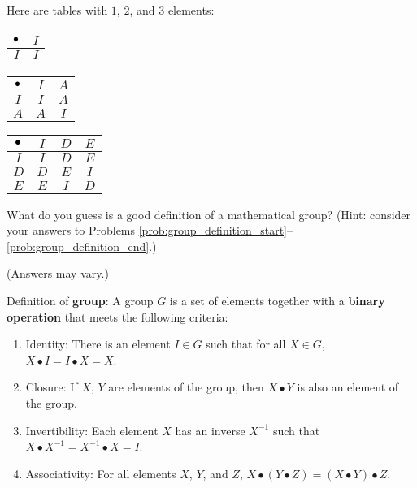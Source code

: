 \documentclass[../gatm_answers.tex]{subfiles}
\begin{document}
Here are tables with $1$, $2$, and $3$ elements:\\
\begin{center}
	\begin{minipage}{0.3\textwidth}
		\centering
		\begin{tabular}{c|c}
			\hline
			$\bullet$ & $I$ \\ \hline
			\rowcolor{light-gray}
			$I$ & $I$ \\ \hline
		\end{tabular}
	\end{minipage}
	\hfill
	\begin{minipage}{0.3\textwidth}
		\centering
		\begin{tabular}{c|cc}
			\hline
			$\bullet$ & $I$ & $A$ \\ \hline
			\rowcolor{light-gray}
			$I$ & $I$ & $A$ \\
			$A$ & $A$ & $I$ \\ \hline
		\end{tabular}
	\end{minipage}
	\hfill
	\begin{minipage}{0.3\textwidth}
		\centering
		\begin{tabular}{c|ccc}
			\hline
			$\bullet$ & $I$ & $D$ & $E$ \\ \hline
			\rowcolor{light-gray}
			$I$ & $I$ & $D$ & $E$ \\
			$D$ & $D$ & $E$ & $I$ \\
			\rowcolor{light-gray}
			$E$ & $E$ & $I$ & $D$ \\ \hline
		\end{tabular}
	\end{minipage}
\end{center}

\begin{outer_problem}
	\item What do you guess is a good definition of a mathematical group? (Hint: consider your answers to Problems \ref{prob:group_definition_start}--\ref{prob:group_definition_end}.)
\end{outer_problem}

\noindent (Answers may vary.)

Definition of \textbf{group}: A group $G$ is a set of elements together with a \textbf{binary operation} that meets the following criteria:
\begin{enumerate}[label=(\alph*)]
\item Identity: There is an element $I\in G$ such that for all $X\in G$, $X\bullet I = I\bullet X = X$.
\item Closure: If $X$, $Y$ are elements of the group, then $X\bullet Y$ is also an element of the group.
\item Invertibility: Each element $X$ has an inverse $X^{-1}$ such that $X\bullet X^{-1} = X^{-1}\bullet X = I$.
\item Associativity: For all elements $X$, $Y$, and $Z$, $X\bullet (Y\bullet Z) = (X\bullet Y) \bullet Z$.
\end{enumerate}
\end{document}
